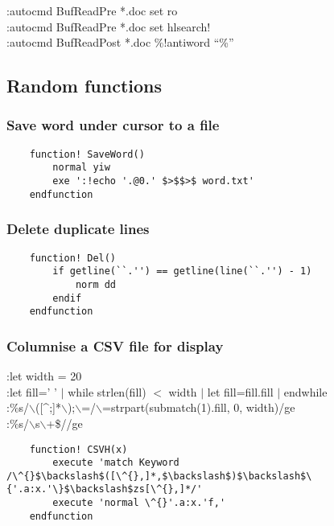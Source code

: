  :autocmd BufReadPre *.doc set ro\\
 :autocmd BufReadPre *.doc set hlsearch!\\
 :autocmd BufReadPost *.doc \%!antiword ``\%''

\subsection{Random functions}

\subsubsection{Save word under cursor to a file}

\begin{code}
\begin{verbatim}
    function! SaveWord()
        normal yiw
        exe ':!echo '.@0.' $>$$>$ word.txt'
    endfunction
\end{verbatim}
\end{code}

\subsubsection{Delete duplicate lines}

\begin{code}
\begin{verbatim}
    function! Del()
        if getline(``.'') == getline(line(``.'') - 1)
            norm dd
        endif
    endfunction
\end{verbatim}
\end{code}

\subsubsection{Columnise a CSV file for display}
:let width = 20\\
:let fill=' ' $|$ while strlen(fill) $<$ width $|$ let fill=fill.fill $|$ endwhile\\
:\%s/$\backslash$([\^{};]*$\backslash$);$\backslash$=/$\backslash$=strpart(submatch(1).fill, 0, width)/ge\\
:\%s/$\backslash$s$\backslash$+\$//ge

\begin{code}
\begin{verbatim}
    function! CSVH(x)
        execute 'match Keyword /\^{}$\backslash$([\^{},]*,$\backslash$)$\backslash$\{'.a:x.'\}$\backslash$zs[\^{},]*/'
        execute 'normal \^{}'.a:x.'f,'
    endfunction
\end{verbatim}
\end{code}

